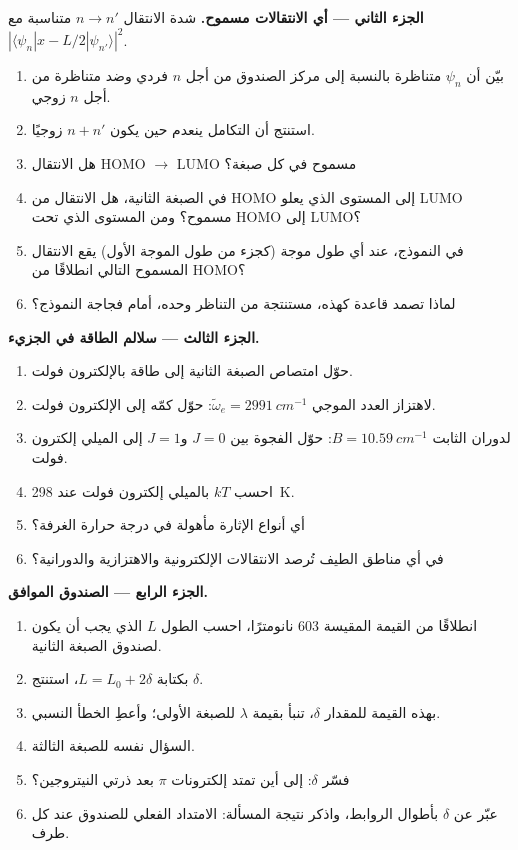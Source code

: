 \begin{problem}
\medskip\noindent\textbf{الجزء الثاني --- أي الانتقالات مسموح.}
شدة الانتقال $n \to n'$ متناسبة مع $|\langle
\psi_n|x - L/2|\psi_{n'}\rangle|^2$.
\begin{enumerate}[resume]
  \item بيّن أن $\psi_n$ متناظرة بالنسبة إلى مركز الصندوق من أجل $n$ فردي
        وضد متناظرة من أجل $n$ زوجي.
  \item استنتج أن التكامل ينعدم حين يكون $n + n'$ زوجيًا.
  \item هل الانتقال HOMO $\to$ LUMO مسموح في كل صبغة؟
  \item في الصبغة الثانية، هل الانتقال من HOMO إلى المستوى
        الذي يعلو LUMO مسموح؟ ومن المستوى الذي تحت HOMO إلى LUMO؟
  \item في النموذج، عند أي طول موجة (كجزء من طول الموجة الأول)
        يقع الانتقال المسموح التالي انطلاقًا من HOMO؟
  \item لماذا تصمد قاعدة كهذه، مستنتجة من التناظر وحده، أمام
        فجاجة النموذج؟
\end{enumerate}

\medskip\noindent\textbf{الجزء الثالث --- سلالم الطاقة في الجزيء.}
\begin{enumerate}[resume]
  \item حوّل امتصاص الصبغة الثانية إلى طاقة بالإلكترون فولت.
  \item لاهتزاز  العدد الموجي $\tilde\omega_e = \qty{2991}{cm^{-1}}$:
        حوّل كمّه إلى الإلكترون فولت.
  \item لدوران  الثابت $B = \qty{10.59}{cm^{-1}}$: حوّل
        الفجوة بين $J = 0$ و$J = 1$ إلى الميلي إلكترون فولت.
  \item احسب $kT$ بالميلي إلكترون فولت عند \qty{298}{K}.
  \item أي أنواع الإثارة مأهولة في درجة حرارة الغرفة؟
  \item في أي مناطق الطيف تُرصد الانتقالات الإلكترونية والاهتزازية
        والدورانية؟
\end{enumerate}

\medskip\noindent\textbf{الجزء الرابع --- الصندوق الموافق.}
\begin{enumerate}[resume]
  \item انطلاقًا من القيمة المقيسة 603 نانومترًا، احسب الطول $L$ الذي يجب أن يكون
        لصندوق الصبغة الثانية.
  \item بكتابة $L = L_0 + 2\delta$، استنتج $\delta$.
  \item بهذه القيمة للمقدار $\delta$، تنبأ بقيمة $\lambda$ للصبغة الأولى؛ وأعطِ
        الخطأ النسبي.
  \item السؤال نفسه للصبغة الثالثة.
  \item فسّر $\delta$: إلى أين تمتد إلكترونات $\pi$ بعد
        ذرتي النيتروجين؟
  \item عبّر عن $\delta$ بأطوال الروابط، واذكر نتيجة
        المسألة: الامتداد الفعلي للصندوق عند كل طرف.
\end{enumerate}
\end{problem}
